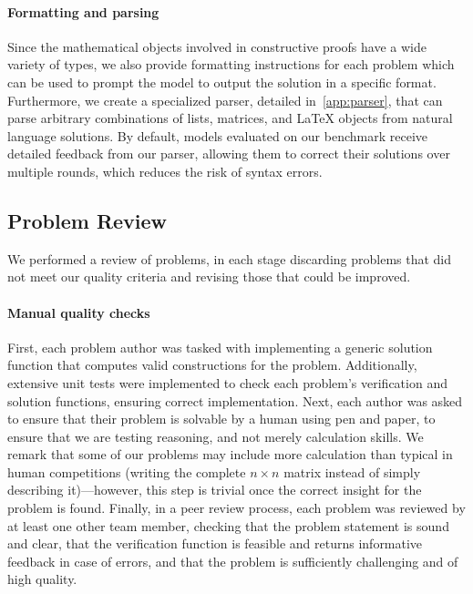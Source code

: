 \paragraph{Formatting and parsing}
Since the mathematical objects involved in constructive proofs have a wide variety of types, we also provide 
formatting instructions for each problem which can be used to prompt the model to output the solution in a specific format.
Furthermore, we create a specialized parser, detailed in~\cref{app:parser}, that can parse arbitrary combinations of lists, matrices, and \LaTeX{} objects from natural language solutions. 
By default, models evaluated on our benchmark receive detailed feedback from our parser, allowing them to correct their solutions over multiple rounds, which reduces the risk of syntax errors.

\subsection{Problem Review} \label{sec:benchmark:review}    
We performed a review of \mc{} problems, in each stage discarding problems that did not meet our quality criteria and revising those that could be improved.

\paragraph{Manual quality checks}
First, each problem author was tasked with implementing a generic solution function that computes valid constructions for the problem. Additionally, extensive unit tests were implemented to check each problem's verification and solution functions, ensuring correct implementation.
Next, each author was asked to ensure that their problem is solvable by a human using pen and paper, to ensure that we are testing reasoning, and not merely calculation skills.
We remark that some of our problems may include more calculation than typical in human competitions (\eg writing the complete $n \times n$ matrix instead of simply describing it)---however, this step is trivial once the correct insight for the problem is found.
Finally, in a peer review process, each problem was reviewed by at least one other team member, checking that the problem statement is sound and clear, that the verification function is feasible and returns informative feedback in case of errors, and that the problem is sufficiently challenging and of high quality.

